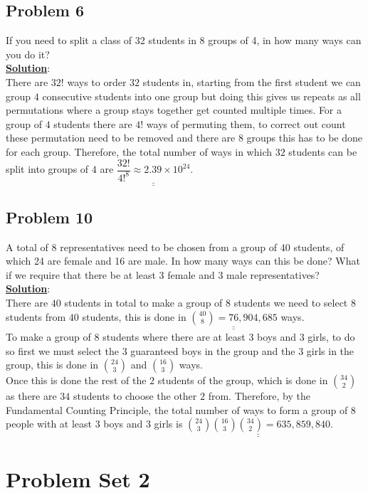 \documentclass[11pt,letter paper]{report}
\begin{document}
\subsection*{Problem 6}
If you need to split a class of 32 students in 8 groups of 4, in how many ways can you do it?\\[0.1cm]
{\bf \underline{Solution}}:\\
There are $32!$ ways to order $32$ students in, starting from the first student we can group $4$ consecutive students into one group but doing this gives us repeats as all permutations where a group stays together get counted multiple times. For a group of $4$ students there are $4!$ ways of permuting them, to correct out count these permutation need to be removed and there are $8$ groups this has to be done for each group. Therefore, the total number of ways in which $32$ students can be split into groups of $4$ are $\underline{\underline{\dfrac{32!}{4!^8}\approx2.39\times10^24}}$.

\subsection*{Problem 10}
A total of 8 representatives need to be chosen from a group of 40 students, of which 24 are female and 16 are male. In how many ways can this be done? What if we require that there be at least 3 female and 3 male representatives?\\[0.1cm]
{\bf \underline{Solution}}:\\
There are $40$ students in total to make a group of $8$ students we need to select $8$ students from $40$ students, this is done in $\underline{\underline{\binom{40}{8}=76,904,685}}$ ways.\\
To make a group of $8$ students where there are at least $3$ boys and $3$ girls, to do so first we must select the $3$ guaranteed boys in the group and the $3$ girls in the group, this is done in $\binom{24}{3}$ and $\binom{16}{3}$ ways.\\
Once this is done the rest of the $2$ students of the group, which is done in $\binom{34}{2}$ as there are $34$ students to choose the other $2$ from. Therefore, by the Fundamental Counting Principle, the total number of ways to form a group of $8$ people with at least $3$ boys and $3$ girls is $\underline{\underline{\binom{24}{3}\binom{16}{3}\binom{34}{2}=635,859,840}}$.  

%
\section*{Problem Set 2}
\end{document}
